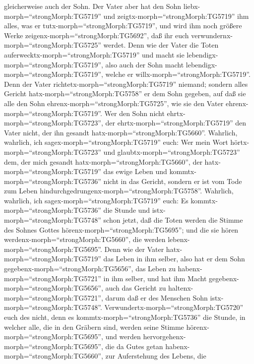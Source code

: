 gleicherweise auch der Sohn.  Der Vater aber hat den Sohn
liebx-morph=``strongMorph:TG5719'' und
zeigtx-morph=``strongMorph:TG5719'' ihm alles, was er
tutx-morph=``strongMorph:TG5719'', und wird ihm noch größere Werke
zeigenx-morph=``strongMorph:TG5692'', daß ihr euch
verwundernx-morph=``strongMorph:TG5725'' werdet.  Denn wie
der Vater die Toten auferwecktx-morph=``strongMorph:TG5719'' und macht
sie lebendigx-morph=``strongMorph:TG5719'', also auch der Sohn macht
lebendigx-morph=``strongMorph:TG5719'', welche er
willx-morph=``strongMorph:TG5719''.  Denn der Vater
richtetx-morph=``strongMorph:TG5719'' niemand; sondern alles Gericht
hatx-morph=``strongMorph:TG5758'' er dem Sohn gegeben,  auf
daß sie alle den Sohn ehrenx-morph=``strongMorph:TG5725'', wie sie den
Vater ehrenx-morph=``strongMorph:TG5719''. Wer den Sohn nicht
ehrtx-morph=``strongMorph:TG5723'', der
ehrtx-morph=``strongMorph:TG5719'' den Vater nicht, der ihn gesandt
hatx-morph=``strongMorph:TG5660''.  Wahrlich, wahrlich, ich
sagex-morph=``strongMorph:TG5719'' euch: Wer mein Wort
hörtx-morph=``strongMorph:TG5723'' und
glaubtx-morph=``strongMorph:TG5723'' dem, der mich gesandt
hatx-morph=``strongMorph:TG5660'', der hatx-morph=``strongMorph:TG5719''
das ewige Leben und kommtx-morph=``strongMorph:TG5736'' nicht in das
Gericht, sondern er ist vom Tode zum Leben
hindurchgedrungenx-morph=``strongMorph:TG5758''.  Wahrlich,
wahrlich, ich sagex-morph=``strongMorph:TG5719'' euch: Es
kommtx-morph=``strongMorph:TG5736'' die Stunde und
istx-morph=``strongMorph:TG5748'' schon jetzt, daß die Toten werden die
Stimme des Sohnes Gottes hörenx-morph=``strongMorph:TG5695''; und die
sie hören werdenx-morph=``strongMorph:TG5660'', die werden
lebenx-morph=``strongMorph:TG5695''.  Denn wie der Vater
hatx-morph=``strongMorph:TG5719'' das Leben in ihm selber, also hat er
dem Sohn gegebenx-morph=``strongMorph:TG5656'', das Leben zu
habenx-morph=``strongMorph:TG5721'' in ihm selber,  und hat
ihm Macht gegebenx-morph=``strongMorph:TG5656'', auch das Gericht zu
haltenx-morph=``strongMorph:TG5721'', darum daß er des Menschen Sohn
istx-morph=``strongMorph:TG5748''. 
Verwundertx-morph=``strongMorph:TG5720'' euch des nicht, denn es
kommtx-morph=``strongMorph:TG5736'' die Stunde, in welcher alle, die in
den Gräbern sind, werden seine Stimme
hörenx-morph=``strongMorph:TG5695'',  und werden
hervorgehenx-morph=``strongMorph:TG5695'', die da Gutes getan
habenx-morph=``strongMorph:TG5660'', zur Auferstehung des Lebens, die
